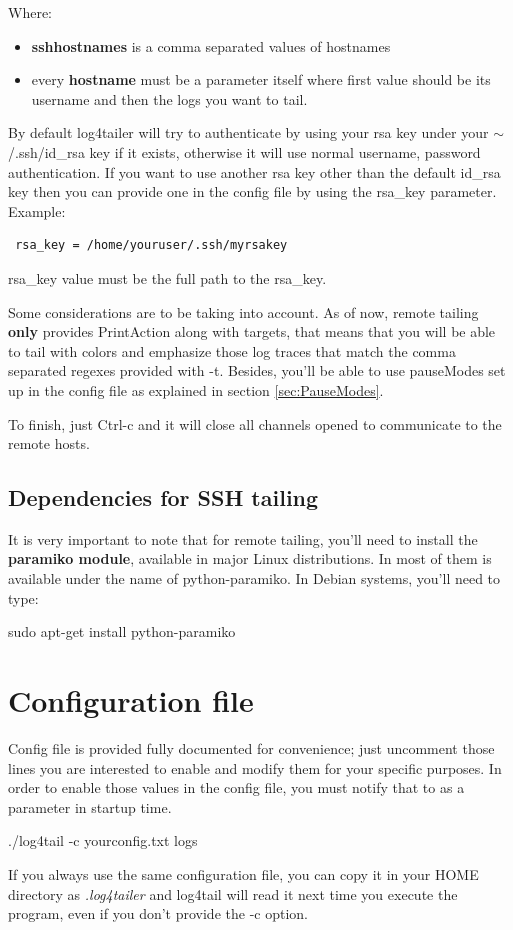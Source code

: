 \noindent
Where:
\begin{itemize}
\item \textbf{sshhostnames} is a comma separated values of hostnames
\item every \textbf{hostname} must be a parameter itself where first value should be its username and 
then the logs you want to tail.
\end{itemize}
By default log4tailer will try to authenticate by using your rsa key under your
$\sim$/.ssh/id\_rsa key if it exists, otherwise it will use normal username, password
authentication. If you want to use another rsa key other than the default
id\_rsa key then you can provide one in the config file by using the rsa\_key
parameter. Example:

\begin{config}
\begin{verbatim}
 rsa_key = /home/youruser/.ssh/myrsakey
\end{verbatim} 
\end{config}

\noindent
rsa\_key value must be the full path to the rsa\_key.

Some considerations are to be taking into account. As of now, remote tailing \textbf{only} provides 
PrintAction along with targets, that means that you will be able to tail with colors and emphasize those log traces 
that match the comma separated regexes provided with -t. Besides, you'll be able to use 
pauseModes set up in the config file as explained in section \ref{sec:PauseModes}.

To finish, just Ctrl-c and it will close all channels opened to communicate to the remote hosts. 

\subsection{Dependencies for SSH tailing}
It is very important to note that for remote tailing, you'll need to install the \textbf{paramiko module}, 
available in major Linux distributions. In most of them is available under the name of python-paramiko. In 
Debian systems, you'll need to type:
\begin{cmd}
 sudo apt-get install python-paramiko
\end{cmd}

\section{Configuration file}
Config file is provided fully documented for convenience; just uncomment those lines you are interested 
to enable and modify them for your specific purposes. In order to enable those values in the config file, 
you must notify that to \logftailer{} as a parameter in startup time.
\begin{cmd}
 ./log4tail -c yourconfig.txt logs
\end{cmd}
If you always use the same configuration file, you can copy it in your HOME directory as \emph{.log4tailer} and log4tail will read it next time you execute the program, even if you 
don't provide the -c option.

